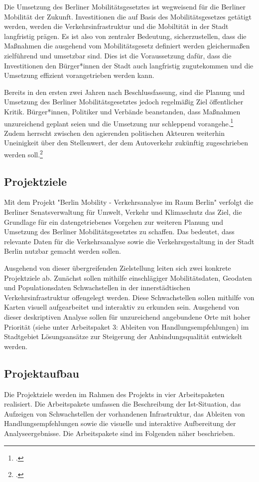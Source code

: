 Die Umsetzung des Berliner Mobilitätsgesetztes ist wegweisend für die Berliner Mobilität der Zukunft. Investitionen die auf Basis des Mobilitätsgesetzes getätigt werden, werden die Verkehrsinfrastruktur und die Mobiltität in der Stadt langfristig prägen. Es ist also von zentraler Bedeutung, sicherzustellen, dass die Maßnahmen die ausgehend vom Mobilitätsgesetz definiert werden gleichermaßen zielführend und umsetzbar sind. Dies ist die Voraussetzung dafür, dass die Investitionen den Bürger*innen der Stadt auch langfristig zugutekommen und die Umsetzung effizient vorangetrieben werden kann.

Bereits in den ersten zwei Jahren nach Beschlussfassung, sind die Planung und Umsetzung des Berliner Mobilitätsgesetztes jedoch regelmäßig Ziel öffentlicher Kritik. Bürger*innen, Politiker und Verbände beanstanden, dass Maßnahmen unzureichend geplant seien und die Umsetzung nur schleppend vorangehe.\footcite{Tagesspiegel.2019} Zudem herrscht zwischen den agierenden politischen Akteuren weiterhin Uneinigkeit über den Stellenwert, der dem Autoverkehr zukünftig zugeschrieben werden soll.\footcite{Tagesspiegel.2020}

\subsection{Projektziele}
Mit dem Projekt "Berlin Mobility - Verkehrsanalyse im Raum Berlin" verfolgt die Berliner Senatsverwaltung für Umwelt, Verkehr und Klimaschutz das Ziel, die Grundlage für ein datengetriebenes Vorgehen zur weiteren Planung und Umsetzung des Berliner Mobilitätsgesetztes zu schaffen. Das bedeutet, dass relevante Daten für die Verkehrsanalyse sowie die Verkehrsgestaltung in der Stadt Berlin nutzbar gemacht werden sollen.

Ausgehend von dieser übergreifenden Zielstellung leiten sich zwei konkrete Projektziele ab. Zunächst sollen mithilfe einschlägiger Mobilitätsdaten, Geodaten und Populationsdaten Schwachstellen in der innerstädtischen Verkehrsinfrastruktur offengelegt werden. Diese Schwachstellen sollen mithilfe von Karten visuell aufgearbeitet und interaktiv zu erkunden sein. Ausgehend von dieser deskriptiven Analyse sollen für unzureichend angebundene Orte mit hoher Priorität (siehe unter Arbeitspaket 3: Ableiten von Handlungsempfehlungen) im Stadtgebiet Lösungsansätze zur Steigerung der Anbindungsqualität entwickelt werden.

\subsection{Projektaufbau}
Die Projektziele werden im Rahmen des Projekts in vier Arbeitspaketen realisiert. Die Arbeitspakete umfassen die Beschreibung der Ist-Situation, das Aufzeigen von Schwachstellen der vorhandenen Infrastruktur, das Ableiten von Handlungsempfehlungen sowie die visuelle und interaktive Aufbereitung der Analyseergebnisse. Die Arbeitspakete sind im Folgenden näher beschrieben.

